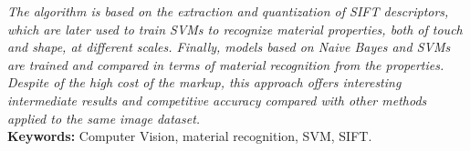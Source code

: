 \documentclass[12pt,a4paper,twoside]{article}
\begin{document}
\begin{singlespace}
\emph{The algorithm is based on the extraction and quantization of \emph{SIFT} descriptors, which are later used to train \emph{SVMs} to recognize material properties, both of touch and shape, at different scales. Finally, models based on \emph{Naive Bayes} and \emph{SVMs} are trained and compared in terms of material recognition from the properties. Despite of the high cost of the markup, this approach offers interesting intermediate results and competitive accuracy compared with other methods applied to the same image dataset.} \\

\textbf{Keywords:} Computer Vision, material recognition, SVM, SIFT. 

\clearpage

\hypertarget{toc}{}
\tableofcontents
\newpage



\clearpage

\newcommand{\checkEmpty}[3]{
    \normalexpandarg
    \exploregroups
    \IfStrEq{#1}{}{#2}{#3}
}

\newcommand{\datasetPath}{../../Dataset}

\newcommand{\e}[1]{\emph{#1}\xspace}


\newcommand{\imageSizeSingle}{0.30}
\newcommand{\dataSizeSingle}{0.65}
\newcommand{\spaceSizeSingle}{0.02}
\newcommand{\inputImage}[8]{
\begin{figure}[!ht]
    \centering
    \begin{minipage}{\imageSizeSingle\textwidth}
        \centering
        \texttt{[image: ../../Dataset/\\matName/\\imgNumber.png]}
    \end{minipage}
    \hspace{\spaceSizeSingle\textwidth}
    \begin{minipage}{\dataSizeSingle\textwidth}
        \textbf{\large \matName \xspace \imgNumber}:

        #7
        \begin{itemize}
            \item \textbf{Fine}: #1, #2.
            \item \textbf{Medium}: #3, #4.
            \item \textbf{Coarse}: #5, #6.
        \end{itemize}
        #8
    \end{minipage}
\end{figure}
\FloatBarrier    
}


\end{singlespace}
\end{document}
